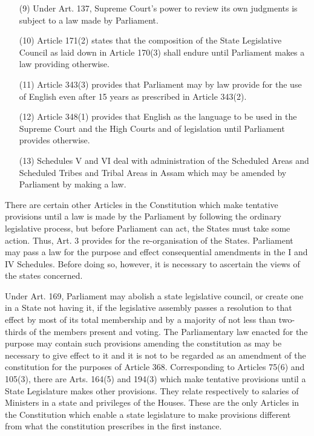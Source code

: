 \begin{multicols}{2}
\begin{enumerate}
\item[(9)] Under Art. 137, Supreme Court's power to review its own judgments is subject to a law made
by Parliament.

\item[(10)] Article 171(2) states that the composition of the State Legislative Council as laid down in
Article 170(3) shall endure until Parliament makes a law providing otherwise.

\item[(11)] Article 343(3) provides that Parliament may by law provide for the use of English even after
15 years as prescribed in Article 343(2).

\item[(12)] Article 348(1) provides that English as the language to be used in the Supreme Court and the
High Courts and of legislation until Parliament provides otherwise.

\item[(13)] Schedules V and VI deal with administration of the Scheduled Areas and Scheduled Tribes
and Tribal Areas in Assam which may be amended by Parliament by making a law.
\end{enumerate}

\noi
There are certain other Articles in the Constitution which make tentative provisions until a law is
made by the Parliament by following the ordinary legislative process, but before Parliament can
act, the States must take some action. Thus, Art. 3 provides for the re-organisation of the States.
Parliament may pass a law for the purpose and effect consequential amendments in the I and IV
Schedules. Before doing so, however, it is necessary to ascertain the views of the states concerned.

\noi
Under Art. 169, Parliament may abolish a state legislative council, or create one in a State not
having it, if the legislative assembly passes a resolution to that effect by most of its total
membership and by a majority of not less than two-thirds of the members present and voting. The
Parliamentary law enacted for the purpose may contain such provisions amending the constitution
as may be necessary to give effect to it and it is not to be regarded as an amendment of the
constitution for the purposes of Article 368. Corresponding to Articles 75(6) and 105(3), there
are Arts. 164(5) and 194(3) which make tentative provisions until a State Legislature makes other
provisions. They relate respectively to salaries of Ministers in a state and privileges of the Houses.
These are the only Articles in the Constitution which enable a state legislature to make provisions
different from what the constitution prescribes in the first instance.


\end{multicols}
